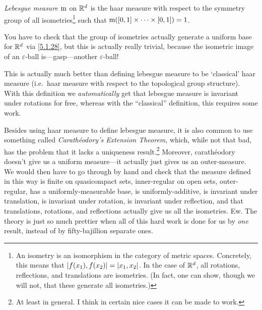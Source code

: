 \begin{dfn}\label{LebesgueMeasure}
\emph{Lebesgue measure} $\mathrm{m}$ on $\mathbb{R} ^d$ is the haar measure with respect to the symmetry group of all isometries\footnote{An isometry is an isomorphism in the category of metric spaces.  Concretely, this means that $\metric[f(x_1)][f(x_2)]=\metric[x_1][x_2]$.  In the case of $\mathbb{R} ^d$, all rotations, reflections, and translations are isometries.  (In fact, one can show, though we will not, that these generate all isometries.)} such that $\mathrm{m} ([0,1]\times \cdots \times [0,1])=1$.
\begin{rmk}
You have to check that the group of isometries actually generate a uniform base for $\mathbb{R} ^d$ via \eqref{5.1.28}, but this is actually really trivial, because the isometric image of an $\varepsilon$-ball is---gasp---another $\varepsilon$-ball!
\end{rmk}
\begin{rmk}
This is actually much better than defining lebesgue measure to be `classical' haar measure (i.e.~haar measure with respect to the topological group structure).  With this definition we \emph{automatically} get that lebesgue measure is invariant under rotations for free, whereas with the ``classical'' definition, this requires some work.
\end{rmk}
\begin{rmk}
Besides using haar measure to define lebesgue measure, it is also common to use something called \emph{Carath\'{e}odory's Extension Theorem}, which, while not that bad, has the problem that it lacks a uniqueness result.\footnote{At least in general.  I think in certain nice cases it can be made to work.}  Moreover, carath\'{e}odory doesn't give us a uniform measure---it actually just gives us an outer-measure.  We would then have to go through by hand and check that the measure defined in this way is finite on quasicompact sets, inner-regular on open sets, outer-regular, has a uniformly-measurable base, is uniformly-additive, is invariant under translation, is invariant under rotation, is invariant under reflection, and that translations, rotations, and reflections actually give us all the isometries.  Ew.  The theory is just so much prettier when all of this hard work is done for us by \emph{one} result, instead of by fifty-bajillion separate ones.
\end{rmk}
\end{dfn}


